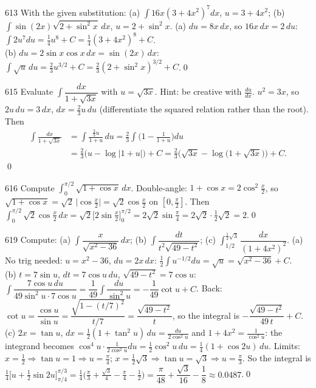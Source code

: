 \begin{bookex}{613}
With the given substitution: (a) $\int16x(3+4x^2)^7dx$, $u=3+4x^2$; (b) $\int\sin(2x)\sqrt{2+\sin^2x}\,dx$, $u=2+\sin^2x$.
\solution
(a) $du=8x\,dx$, so $16x\,dx=2\,du$: $\int2u^7du=\frac14u^8+C=\frac14(3+4x^2)^8+C$.\\
(b) $du=2\sin x\cos x\,dx=\sin(2x)\,dx$: $\int\sqrt u\,du=\frac23u^{3/2}+C=\frac23(2+\sin^2x)^{3/2}+C$.\qed
\end{bookex}

\begin{bookex}{615}
Evaluate $\int\dfrac{dx}{1+\sqrt{3x}}$ with $u=\sqrt{3x}$. Hint: be creative with $\frac{du}{dx}$.
\solution
$u^2=3x$, so $2u\,du=3\,dx$, $dx=\frac23u\,du$ (differentiate the squared relation rather than the root). Then
\begin{align*}
\int\frac{dx}{1+\sqrt{3x}}&=\int\frac{\frac23u}{1+u}\,du=\frac23\int\Big(1-\frac1{1+u}\Big)du\\
&=\frac23\big(u-\log|1+u|\big)+C=\frac23\Big(\sqrt{3x}-\log\big(1+\sqrt{3x}\big)\Big)+C.
\end{align*}\qed
\end{bookex}

\begin{bookex}{616}
Compute $\int_0^{\pi/2}\sqrt{1+\cos x}\,dx$.
\solution
Double-angle: $1+\cos x=2\cos^2\frac x2$, so $\sqrt{1+\cos x}=\sqrt2\,\big|\cos\frac x2\big|=\sqrt2\cos\frac x2$ on $[0,\frac\pi2]$. Then $\int_0^{\pi/2}\sqrt2\cos\frac x2\,dx=\sqrt2\Big[2\sin\frac x2\Big]_0^{\pi/2}=2\sqrt2\sin\frac\pi4=2\sqrt2\cdot\frac12\sqrt2=2$.\qed
\end{bookex}

\begin{bookex}{619}
Compute: (a) $\int\dfrac{x}{\sqrt{x^2-36}}\,dx$; (b) $\int\dfrac{dt}{t^2\sqrt{49-t^2}}$; (c) $\int_{1/2}^{\frac12\sqrt3}\dfrac{dx}{(1+4x^2)^2}$.
\solution
(a) No trig needed: $u=x^2-36$, $du=2x\,dx$: $\frac12\int u^{-1/2}du=\sqrt u=\sqrt{x^2-36}+C$.\\
(b) $t=7\sin u$, $dt=7\cos u\,du$, $\sqrt{49-t^2}=7\cos u$: $\int\dfrac{7\cos u\,du}{49\sin^2u\cdot7\cos u}=\dfrac1{49}\int\dfrac{du}{\sin^2u}=-\dfrac1{49}\cot u+C$. Back: $\cot u=\dfrac{\cos u}{\sin u}=\dfrac{\sqrt{1-(t/7)^2}}{t/7}=\dfrac{\sqrt{49-t^2}}t$, so the integral is $-\dfrac{\sqrt{49-t^2}}{49\,t}+C$.\\
(c) $2x=\tan u$, $dx=\frac12(1+\tan^2u)\,du=\frac{du}{2\cos^2u}$ and $1+4x^2=\frac1{\cos^2u}$: the integrand becomes $\cos^4u\cdot\frac1{2\cos^2u}du=\frac12\cos^2u\,du=\frac14(1+\cos2u)\,du$. Limits: $x=\frac12\Rightarrow\tan u=1\Rightarrow u=\frac\pi4$; $x=\frac12\sqrt3\Rightarrow\tan u=\sqrt3\Rightarrow u=\frac\pi3$. So the integral is $\frac14\big[u+\frac12\sin2u\big]_{\pi/4}^{\pi/3}=\frac14\Big(\frac\pi3+\frac{\sqrt3}4-\frac\pi4-\frac12\Big)=\dfrac\pi{48}+\dfrac{\sqrt3}{16}-\dfrac18\approx0.0487$.\qed
\end{bookex}

